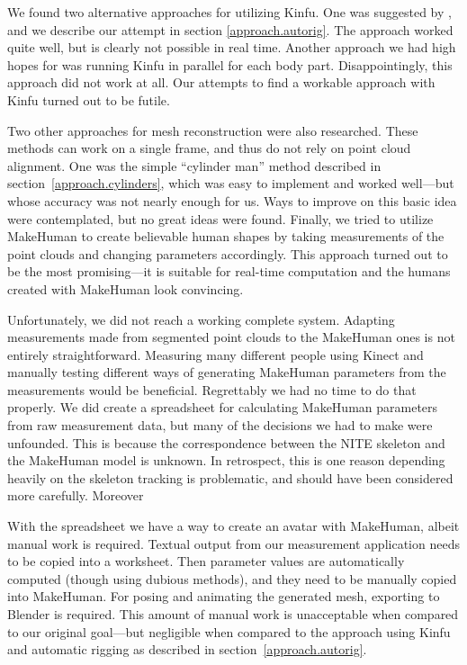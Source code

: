 We found two alternative approaches for utilizing Kinfu. One was suggested by \citet{charpentier2011accurate}, and we describe our attempt in section \ref{approach.autorig}. The approach worked quite well, but is clearly not possible in real time. Another approach we had high hopes for was running Kinfu in parallel for each body part. Disappointingly, this approach did not work at all. Our attempts to find a workable approach with Kinfu turned out to be futile.

Two other approaches for mesh reconstruction were also researched. These methods can work on a single frame, and thus do not rely on point cloud alignment. One was the simple ``cylinder man'' method described in section~\ref{approach.cylinders}, which was easy to implement and worked well---but whose accuracy was not nearly enough for us. Ways to improve on this basic idea were contemplated, but no great ideas were found. Finally, we tried to utilize MakeHuman to create believable human shapes by taking measurements of the point clouds and changing parameters accordingly. This approach turned out to be the most promising---it is suitable for real-time computation and the humans created with MakeHuman look convincing.

Unfortunately, we did not reach a working complete system. Adapting measurements made from segmented point clouds to the MakeHuman ones is not entirely straightforward. Measuring many different people using Kinect and manually testing different ways of generating MakeHuman parameters from the measurements would be beneficial. Regrettably we had no time to do that properly. We did create a spreadsheet for calculating MakeHuman parameters from raw measurement data, but many of the decisions we had to make were unfounded. This is because the correspondence between the NITE skeleton and the MakeHuman model is unknown. In retrospect, this is one reason depending heavily on the skeleton tracking is problematic, and should have been considered more carefully. Moreover 

With the spreadsheet we have a way to create an avatar with MakeHuman, albeit manual work is required. Textual output from our measurement application needs to be copied into a worksheet. Then parameter values are automatically computed (though using dubious methods), and they need to be manually copied into MakeHuman. For posing and animating the generated mesh, exporting to Blender is required. This amount of manual work is unacceptable when compared to our original goal---but negligible when compared to the approach using Kinfu and automatic rigging as described in section~\ref{approach.autorig}.

